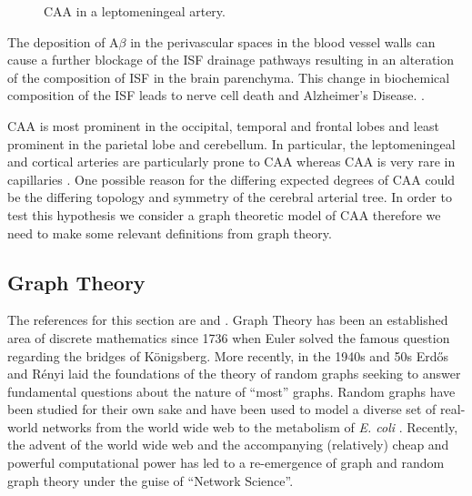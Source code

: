 \documentclass[12pt]{article} %
\theoremstyle{definition}
\begin{document}
\begin{figure}[H]

              \centering
                \caption{CAA in a leptomeningeal artery.}
\end{figure}

The deposition of A$\beta$ in the perivascular spaces in the  blood vessel walls can cause a further blockage of the ISF drainage pathways resulting in an alteration of the composition of ISF in the brain parenchyma. This change in biochemical composition of the ISF leads to nerve cell death and Alzheimer's Disease. \cite{Rox}.  

CAA  is most prominent in the occipital, temporal and frontal lobes and least prominent in the parietal lobe and cerebellum.  In particular,  the leptomeningeal and cortical arteries are particularly prone to CAA whereas CAA is very rare in capillaries \cite{Preston}.  One possible reason for the differing expected degrees of CAA could be the differing topology and symmetry of the cerebral arterial tree.  In order to test this hypothesis we consider a graph theoretic model of CAA therefore we need to make some relevant definitions from graph theory.  







\subsection{Graph Theory}\label{trees}  The references for this section are \cite{Bela} 
and \cite{varietiesofincreasingtrees}.
Graph Theory has been an established area of discrete mathematics since 1736 when Euler 
solved the famous question regarding the bridges of K\"{o}nigsberg.  More recently, in the 
1940s and 50s Erd\H{o}s and R\'{e}nyi laid the foundations of the theory of random graphs 
seeking to answer fundamental questions about the nature of ``most'' graphs. Random graphs 
have been studied for their own sake and have been used to model a diverse set of real-world 
networks from the world wide web to the metabolism of \emph{E. coli} \cite{barabasi}. Recently, the advent of the world wide web and the accompanying %
(relatively) cheap and powerful computational power has led to a re-emergence of graph and 
random graph theory under the guise of ``Network Science''. 
\end{document}
